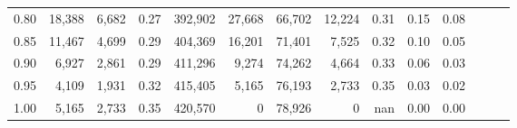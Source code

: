 \begin{tabular}{rrrrrrrrrrrrrr}
0.80 &  18,388 &  6,682 &  0.27 &  392,902 &   27,668 &  66,702 &  12,224 &  0.31 &  0.15 &      0.08 \\
0.85 &  11,467 &  4,699 &  0.29 &  404,369 &   16,201 &  71,401 &   7,525 &  0.32 &  0.10 &      0.05 \\
0.90 &   6,927 &  2,861 &  0.29 &  411,296 &    9,274 &  74,262 &   4,664 &  0.33 &  0.06 &      0.03 \\
0.95 &   4,109 &  1,931 &  0.32 &  415,405 &    5,165 &  76,193 &   2,733 &  0.35 &  0.03 &      0.02 \\
1.00 &   5,165 &  2,733 &  0.35 &  420,570 &        0 &  78,926 &       0 &   nan &  0.00 &      0.00 \\
\bottomrule
\end{tabular}
